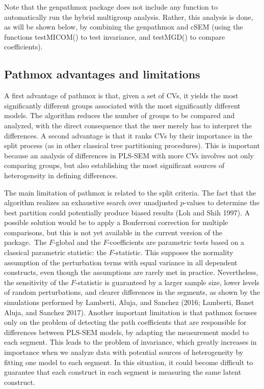 Note that the genpathmox package does not include any function to
automatically run the hybrid multigroup analysis. Rather, this analysis
is done, as will be shown below, by combining the genpathmox and cSEM
(using the functions testMICOM() to test invariance, and testMGD() to
compare coefficients).

\hypertarget{pathmox-advantages-and-limitations}{%
\subsection{Pathmox advantages and limitations}\label{pathmox-advantages-and-limitations}}

A first advantage of pathmox is that, given a set of CVs, it yields the
most significantly different groups associated with the most
significantly different models. The algorithm reduces the number of
groups to be compared and analyzed, with the direct consequence that the
user merely has to interpret the differences. A second advantage is that
it ranks CVs by their importance in the split process (as in other
classical tree partitioning procedures). This is important because an
analysis of differences in PLS-SEM with more CVs involves not only
comparing groups, but also establishing the most significant sources of
heterogeneity in defining differences.

The main limitation of pathmox is related to the split criteria. The
fact that the algorithm realizes an exhaustive search over unadjusted
\(p\)-values to determine the best partition could potentially produce
biased results (Loh and Shih 1997). A possible solution would be to apply a
Bonferroni correction for multiple comparisons, but this is not yet
available in the current version of the package.~The \(F\)-global and the
\(F\)-coefficients are parametric tests based on a classical parametric
statistic: the \(F\)-statistic. This supposes the normality assumption of
the perturbation terms with equal variance in all dependent constructs,
even though the assumptions are rarely met in practice. Nevertheless,
the sensitivity of the \(F\)-statistic is guaranteed by a larger sample
size, lower levels of random perturbations, and clearer differences in
the segments, as shown by the simulations performed by Lamberti, Aluja, and Sanchez (2016; Lamberti, Banet Aluja, and Sanchez 2017). Another important limitation is that pathmox focuses only
on the problem of detecting the path coefficients that are responsible
for differences between PLS-SEM models, by adapting the measurement
model to each segment. This leads to the problem of invariance, which
greatly increases in importance when we analyze data with potential
sources of heterogeneity by fitting one model to each segment. In this
situation, it could become difficult to guarantee that each construct in
each segment is measuring the same latent construct.

